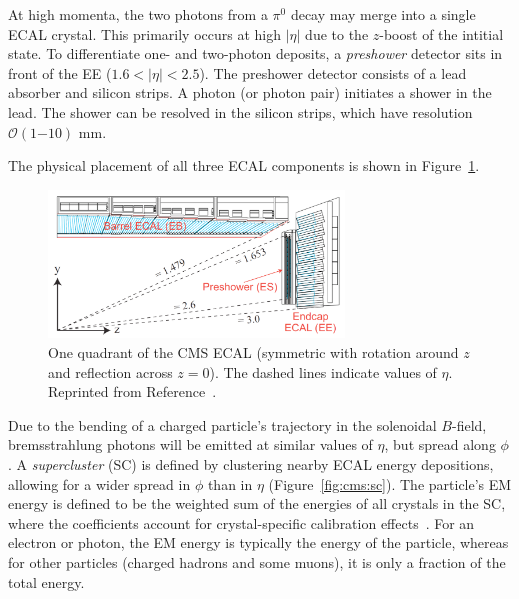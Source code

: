 At high momenta, the two photons from a $\pi^0$ decay may merge into a single ECAL crystal. 
This primarily occurs at high $|\eta|$ due to the $z$-boost of the intitial state.
To differentiate one- and two-photon deposits, a \emph{preshower} detector sits in front of the EE ($1.6 < |\eta|<2.5$).
The preshower detector consists of a lead absorber and silicon strips.
A photon (or photon pair) initiates a shower in the lead.
The shower can be resolved in the silicon strips, which have resolution $\mathcal{O}(1\mathrm{-}10)$ mm.

The physical placement of all three ECAL components is shown in Figure~\ref{fig:cms:ecal}.

\begin{figure}[]
    \begin{center} 
        \includegraphics[width=0.7\textwidth]{figures/cms/ecal.png}
        \caption{One quadrant of the CMS ECAL (symmetric with rotation around $z$ and reflection across $z=0$).
                 The dashed lines indicate values of $\eta$.
                 Reprinted from Reference~\cite{cmsecaljinst}.}
        \label{fig:cms:ecal}
    \end{center}
\end{figure}

Due to the bending of a charged particle's trajectory in the solenoidal $B$-field, bremsstrahlung photons will be emitted at similar values of $\eta$, but spread along $\phi$.
A \emph{supercluster} (SC) is defined by clustering nearby ECAL energy depositions, allowing for a wider spread in $\phi$ than in $\eta$ (Figure~\ref{fig:cms:sc}).
The particle's EM energy is defined to be the weighted sum of the energies of all crystals in the SC, where the coefficients account for crystal-specific calibration effects~\cite{cmsecalreco}.
For an electron or photon, the EM energy is typically the energy of the particle, whereas for other particles (charged hadrons and some muons), it is only a fraction of the total energy.

